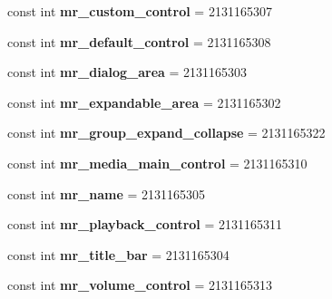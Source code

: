 \begin{DoxyCompactItemize}
\item 
\mbox{\label{classXaria_1_1Resource_1_1Id_a4ab57f78d0943fde89756c4022ff9b86}} 
const int {\bfseries mr\+\_\+custom\+\_\+control} = 2131165307
\item 
\mbox{\label{classXaria_1_1Resource_1_1Id_a4e7783cd9c0b8b6fc075599b5aa330af}} 
const int {\bfseries mr\+\_\+default\+\_\+control} = 2131165308
\item 
\mbox{\label{classXaria_1_1Resource_1_1Id_a5b344fba265a880c2dc724cc93ef12bd}} 
const int {\bfseries mr\+\_\+dialog\+\_\+area} = 2131165303
\item 
\mbox{\label{classXaria_1_1Resource_1_1Id_a48676d967e152ca63c51adde1a526e77}} 
const int {\bfseries mr\+\_\+expandable\+\_\+area} = 2131165302
\item 
\mbox{\label{classXaria_1_1Resource_1_1Id_acf28f13c86e347daa863ae15754ab101}} 
const int {\bfseries mr\+\_\+group\+\_\+expand\+\_\+collapse} = 2131165322
\item 
\mbox{\label{classXaria_1_1Resource_1_1Id_a2a11a7ceeafb13b55760039179035228}} 
const int {\bfseries mr\+\_\+media\+\_\+main\+\_\+control} = 2131165310
\item 
\mbox{\label{classXaria_1_1Resource_1_1Id_a89ee8d414ed56ca97a536bbc1a1a8e79}} 
const int {\bfseries mr\+\_\+name} = 2131165305
\item 
\mbox{\label{classXaria_1_1Resource_1_1Id_a87f7c31f42339f249a49a5680f7bd973}} 
const int {\bfseries mr\+\_\+playback\+\_\+control} = 2131165311
\item 
\mbox{\label{classXaria_1_1Resource_1_1Id_aa80f5c3b4d8c5b98d04d223f86bae66e}} 
const int {\bfseries mr\+\_\+title\+\_\+bar} = 2131165304
\item 
\mbox{\label{classXaria_1_1Resource_1_1Id_af249bf64d5a6ae70f6d546c2cf18beb0}} 
const int {\bfseries mr\+\_\+volume\+\_\+control} = 2131165313

\end{DoxyCompactItemize}
